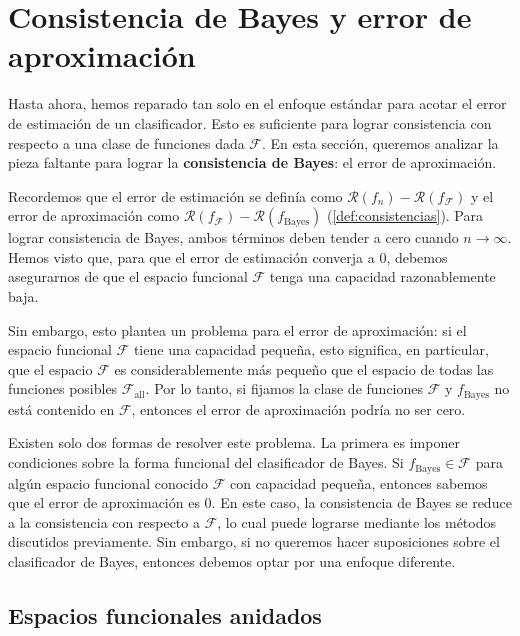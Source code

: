 \documentclass{report}
\begin{document}
\section{Consistencia de Bayes y error de aproximación}

Hasta ahora, hemos reparado tan solo en el enfoque estándar para acotar el error de estimación 
de un clasificador. Esto es suficiente para lograr consistencia con respecto a una clase de funciones 
dada \(\mathcal{F}\). En esta sección, queremos analizar la pieza faltante para lograr la 
\textbf{consistencia de Bayes}: el error de aproximación.\newline

Recordemos que el error de estimación se definía como \(\mathcal{R}(f_n) - \mathcal{R}(f_{\mathcal{F}})\) 
y el error de aproximación como \(\mathcal{R}(f_{\mathcal{F}}) - \mathcal{R}(f_{\text{Bayes}})\) 
(\ref{def:consistencias}). Para lograr consistencia de Bayes, ambos términos deben tender a cero cuando 
\(n \to \infty\). Hemos visto que, para que el error de estimación converja a \(0\), debemos 
asegurarnos de que el espacio funcional \(\mathcal{F}\) tenga una capacidad razonablemente baja.\newline

Sin embargo, esto plantea un problema para el error de aproximación: si el espacio funcional 
\(\mathcal{F}\) tiene una capacidad pequeña, esto significa, en particular, que el espacio 
\(\mathcal{F}\) es considerablemente más pequeño que el espacio de todas las funciones posibles 
\(\mathcal{F}_{\text{all}}\). Por lo tanto, si fijamos la clase de funciones \(\mathcal{F}\) y 
\(f_{\text{Bayes}}\) no está contenido en \(\mathcal{F}\), entonces el 
error de aproximación podría no ser cero.\newline

Existen solo dos formas de resolver este problema. La primera es imponer condiciones sobre la 
forma funcional del clasificador de Bayes. Si \(f_{\text{Bayes}} \in \mathcal{F}\) para algún 
espacio funcional conocido \(\mathcal{F}\) con capacidad pequeña, entonces sabemos que el error 
de aproximación es \(0\). En este caso, la consistencia de Bayes se reduce a la consistencia con 
respecto a \(\mathcal{F}\), lo cual puede lograrse mediante los métodos discutidos previamente. 
Sin embargo, si no queremos hacer suposiciones sobre el clasificador de Bayes, entonces 
debemos optar por una enfoque diferente.\newline

\subsection{Espacios funcionales anidados}
\end{document}
